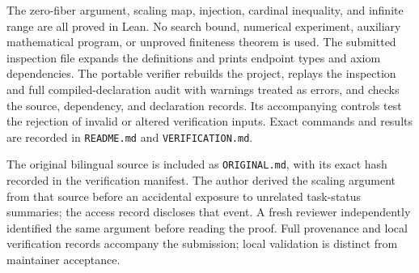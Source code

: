 \documentclass[11pt]{article}
\begin{document}
The zero-fiber argument, scaling map, injection, cardinal inequality, and infinite
range are all proved in Lean. No search bound, numerical experiment, auxiliary
mathematical program, or unproved finiteness theorem is used. The submitted
inspection file expands the definitions and prints endpoint types and axiom
dependencies. The portable verifier rebuilds the project, replays the inspection
and full compiled-declaration audit with warnings treated as errors, and checks
the source, dependency, and declaration records. Its accompanying controls test
the rejection of invalid or altered verification inputs. Exact commands and
results are recorded in \nolinkurl{README.md} and \nolinkurl{VERIFICATION.md}.

The original bilingual source is included as \nolinkurl{ORIGINAL.md}, with
its exact hash recorded in the verification manifest.
The author derived the scaling argument from that source before an accidental
exposure to unrelated task-status summaries; the access record discloses that
event. A fresh reviewer independently identified the same argument before
reading the proof. Full provenance and local verification records accompany
the submission; local validation is distinct from maintainer acceptance.
\end{document}
